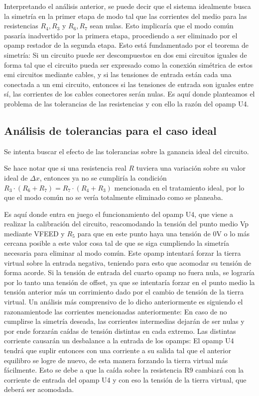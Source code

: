 \documentclass[../../tc_tp3_main.tex]{subfiles}
\begin{document}
 	Interpretando el análisis anterior, se puede decir que el sistema idealmente busca la simetría en la primer etapa de modo tal que las corrientes del medio para las resistencias $R_4, R_3$ y $R_6, R_7$ sean nulas. Esto implicaría que el modo común pasaría inadvertido por la primera etapa, procediendo a ser eliminado por el opamp restador de la segunda etapa. Esto está fundamentado por el teorema de simetría: Si un circuito puede ser descompuestos en dos emi circuitos iguales de forma tal que el circuito pueda ser expresado como la conexión simétrica de estos emi circuitos mediante cables, y si las tensiones de entrada están cada una conectada a un emi circuito, entonces si las tensiones de entrada son iguales entre sí, las corrientes de los cables conectores serán nulas. Es aquí donde planteamos el problema de las tolerancias de las resistencias y con ello la razón del opamp U4.
 	
\subsection{Análisis de tolerancias para el caso ideal}

Se intenta buscar el efecto de las tolerancias sobre la ganancia ideal del circuito.\par
Se hace notar que si una resistencia real $R$ tuviera una variación sobre su valor ideal de $\Delta x$, entonces ya no se cumpliría la condición $R_3\cdot (R_6 + R_7) = R_7\cdot (R_4 + R_3)$ mencionada en el tratamiento ideal, por lo que el modo común no se vería totalmente eliminado como se planeaba.\par 
Es aquí donde entra en juego el funcionamiento del opamp U4, que viene a realizar la calibración del circuito, reacomodando la tensión del punto medio Vp mediante VFEED y $R_5$ para que en este punto haya una tensión de 0V o lo más cercana posible a este valor cosa tal de que se siga cumpliendo la simetría necesaria para eliminar al modo común. 
Este opamp intentará forzar la tierra virtual sobre la entrada negativa, teniendo para esto que acomodar su tensión de forma acorde. 
Si la tensión de entrada del cuarto opamp no fuera nula, se lograría por lo tanto una tensión de offset, ya que se intentaría forzar en el punto medio la tensión anterior más un corrimiento dado por el cambio de tensión de la tierra virtual. 
Un análisis más comprensivo de lo dicho anteriormente es siguiendo el razonamientode las corrientes mencionadas anteriormente: En caso de no cumplirse la simetría deseada, las corrientes intermedias dejarán de ser nulas y por ende forzarán caídas de tensión distintas en cada extremo. Las distintas corriente causarán un desbalance a la entrada de los opamps: El opamp U4 tendrá que suplir entonces con una corriente a su salida tal que el anterior equilibro se logre de nuevo, de esta manera forzando la tierra virtual más fácilmente. Esto se debe a que la caída sobre la resistencia R9 cambiará con la corriente de entrada del opamp U4 y con eso la tensión de la tierra virtual, que deberá ser acomodada.
\end{document}

